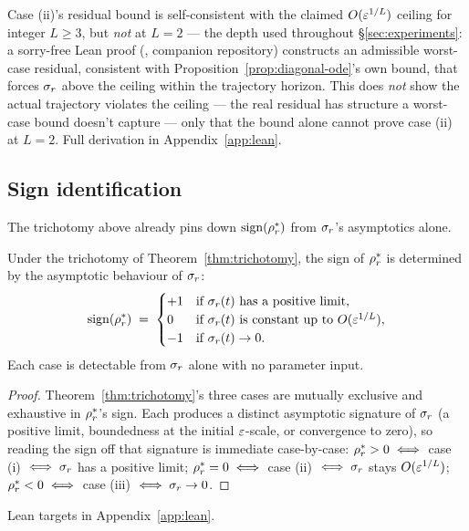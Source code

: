 \begin{remark}[Zero-branch ceiling: residual bound insufficient at $L=2$]
\label{rem:zero-ceiling-gap}
Case (ii)'s residual bound is self-consistent with the claimed $O(\varepsilon^{1/L})$ ceiling
for integer $L\ge3$, but \emph{not} at $L=2$ --- the depth used throughout
\S\ref{sec:experiments}: a sorry-free Lean proof
(, companion repository)
constructs an admissible worst-case residual, consistent with
Proposition~\ref{prop:diagonal-ode}'s own bound, that forces $\sigma_r$ above the ceiling
within the trajectory horizon. This does \emph{not} show the actual trajectory violates
the ceiling --- the real residual has structure a worst-case bound doesn't capture ---
only that the bound alone cannot prove case (ii) at $L=2$. Full derivation in
Appendix~\ref{app:lean}.
\end{remark}


\subsection{Sign identification}
\label{ssec:sign-id}

The trichotomy above already pins down $\operatorname{sign}(\rho_r^*)$ from $\sigma_r$'s asymptotics alone.

\begin{corollary}
\label{cor:sign-id}
Under the trichotomy of Theorem~\ref{thm:trichotomy}, the sign of
$\rho_r^*$ is determined by the asymptotic behaviour of $\sigma_r$:
\[
\operatorname{sign}(\rho_r^*) \;=\;
\begin{cases}
+1 & \text{if } \sigma_r(t) \text{ has a positive limit,} \\
0 & \text{if } \sigma_r(t) \text{ is constant up to } O(\varepsilon^{1/L}), \\
-1 & \text{if } \sigma_r(t) \to 0.
\end{cases}
\]
Each case is detectable from $\sigma_r$ alone with no parameter input.
\end{corollary}

\begin{proof}
Theorem~\ref{thm:trichotomy}'s three cases are mutually exclusive and exhaustive in
$\rho_r^*$'s sign. Each produces a distinct asymptotic signature of $\sigma_r$ (a
positive limit, boundedness at the initial $\varepsilon$-scale, or convergence to zero), so
reading the sign off that signature is immediate case-by-case: $\rho_r^*>0 \iff$ case (i)
$\iff \sigma_r$ has a positive limit; $\rho_r^*=0 \iff$ case (ii) $\iff \sigma_r$ stays
$O(\varepsilon^{1/L})$; $\rho_r^*<0 \iff$ case (iii) $\iff \sigma_r\to0$.
\end{proof}
Lean targets in Appendix~\ref{app:lean}.

